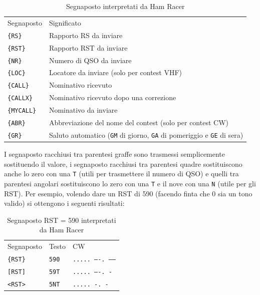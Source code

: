 \begin{table}[h]
	\begin{center}
		\begin{tabular}{ll}	
			\rowcolor{gray!50}
			Segnaposto & Significato\\
			\texttt{\{RS\}}& Rapporto RS da inviare\\
			\texttt{\{RST\}}& Rapporto RST da inviare\\			
			\texttt{\{NR\}}& Numero di QSO da inviare\\
			\texttt{\{LOC\}}& Locatore da inviare (solo per contest VHF)\\
			\texttt{\{CALL\}}& Nominativo ricevuto\\
			\texttt{\{CALLX\}}& Nominativo ricevuto dopo una correzione\\
			\texttt{\{MYCALL\}}& Nominativo da inviare\\
			\texttt{\{ABR\}}& Abbreviazione del nome del contest (solo per contest CW)\\
			\texttt{\{GR\}}& Saluto automatico (\texttt{GM} di giorno, \texttt{GA} di pomeriggio e \texttt{GE} di sera)\\
		\end{tabular}
	\end{center}
	\caption{Segnaposto interpretati da Ham Racer}
	\label{tab:plc}
\end{table}


I segnaposto racchiusi tra parentesi graffe sono trasmessi semplicemente sostituendo il valore, i segnaposto racchiusi tra parentesi quadre sostituiscono anche lo zero con una \texttt{T} (utili per trasmettere il numero di QSO) e quelli tra parentesi angolari sostituiscono lo zero con una \texttt{T} e il nove con una \texttt{N} (utile per gli RST).
Per esempio, volendo dare un RST di 590 (facendo finta che 0 sia un tono valido) si ottengono i seguenti risultati:
\begin{table}[h]
	\begin{center}
		\begin{tabular}{lll}	
			\rowcolor{gray!50}
			Segnaposto & Testo & CW\\
			\texttt{\{RST\}}& \texttt{590} & \texttt{..... ----. -----}\\
			\texttt{[RST]}& \texttt{59T} & \texttt{..... ----. -}\\
			\texttt{<RST>}& \texttt{5NT} & \texttt{..... -. -}\\
		\end{tabular}
	\end{center}
	\caption{Segnaposto RST = 590 interpretati da Ham Racer}
	\label{tab:rst}
\end{table}


